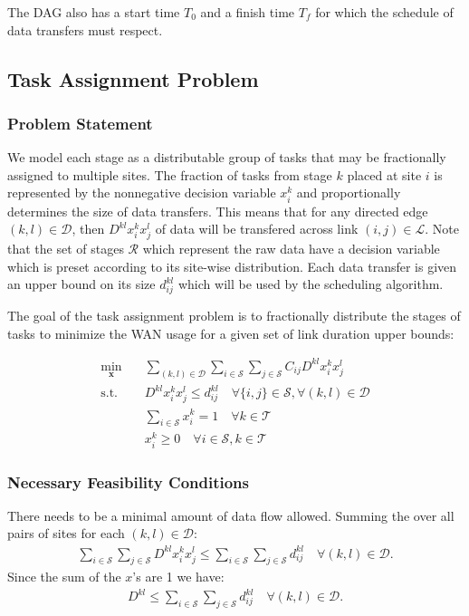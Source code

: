 The DAG also has a start time $T_0$ and a finish time $T_f$ for which the schedule of data transfers must respect.

\subsection{Task Assignment Problem}

\subsubsection{Problem Statement}

We model each stage as a distributable group of tasks that may be fractionally assigned to multiple sites.
The fraction of tasks from stage $k$ placed at site $i$ is represented by the nonnegative decision variable $x_i^k$ and proportionally determines the size of data transfers.
This means that for any directed edge $(k,l)\in\mathcal{D}$, then $D^{kl}x_i^kx_j^l$ of data will be transfered across link $(i,j)\in\mathcal{L}$.
Note that the set of stages $\mathcal{R}$ which represent the raw data have a decision variable which is preset according to its site-wise distribution.
Each data transfer is given an upper bound on its size $d_{ij}^{kl}$ which will be used by the scheduling algorithm.

The goal of the task assignment problem is to fractionally distribute the stages of tasks to minimize the WAN usage for a given set of link duration upper bounds:

\begin{subequations}\label{eq:opt_task}
	\begin{align}
		\min_{\mathbf{x}} \quad & \sum_{(k,l)\in\mathcal{D}}\sum_{i\in\mathcal{S}}\sum_{j\in\mathcal{S}}C_{ij}D^{kl}x_i^kx_j^l \nonumber \\
		\text{s.t.}\quad & D^{kl}x_i^kx_j^l \leq d_{ij}^{kl} \quad \forall\{i,j\}\in\mathcal{S}, \forall(k,l)\in\mathcal{D} \label{eq:opt_task-duration} \\
		& \sum_{i\in\mathcal{S}}x_i^k = 1 \quad \forall k\in\mathcal{T} \label{eq:opt_task-sum1} \\
		& x_i^k \geq 0 \quad \forall i\in\mathcal{S},k\in\mathcal{T} \label{eq:opt_task-nonneg}
	\end{align}
\end{subequations}

\subsubsection{Necessary Feasibility Conditions} There needs to be a minimal amount of data flow allowed. Summing the over all pairs of sites for each $(k,l)\in\mathcal{D}$:
\begin{align}
	\sum_{i\in\mathcal{S}}\sum_{j\in\mathcal{S}}D^{kl}x_i^kx_j^l \leq \sum_{i\in\mathcal{S}}\sum_{j\in\mathcal{S}}d_{ij}^{kl} \quad\forall (k,l)\in\mathcal{D}. \nonumber
\end{align}
Since the sum of the $x$'s are 1 we have:
\begin{align}
	D^{kl} \leq \sum_{i\in\mathcal{S}}\sum_{j\in\mathcal{S}}d_{ij}^{kl} \quad\forall (k,l)\in\mathcal{D}.
\end{align}

